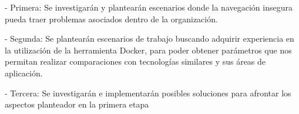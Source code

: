 -	Primera: Se investigarán y plantearán escenarios donde la navegación insegura pueda traer problemas asociados dentro de la organización. 

-	Segunda: Se plantearán escenarios de trabajo buscando adquirir experiencia en la utilización de la herramienta Docker, para poder obtener parámetros que nos permitan realizar comparaciones con tecnologías similares y sus áreas de aplicación.

-	Tercera: Se investigarán e implementarán posibles soluciones para afrontar los 
aspectos planteador en la primera etapa 



